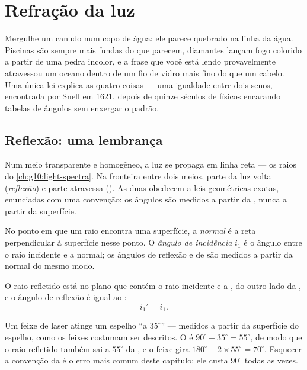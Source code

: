 \chapter{Refração da luz}\label{ch:g10:refraction}

Mergulhe um canudo num copo de água: ele parece quebrado na linha da
água. Piscinas são sempre mais fundas do que parecem, diamantes lançam
fogo colorido a partir de uma pedra incolor, e a frase que você está
lendo provavelmente atravessou um oceano dentro de um fio de vidro mais
fino do que um cabelo. Uma única lei explica as quatro coisas --- uma
igualdade entre dois senos, encontrada por Snell em 1621, depois de
quinze séculos de físicos encarando tabelas de ângulos sem enxergar o
padrão.

\section{Reflexão: uma lembrança}

Num meio transparente e homogêneo, a luz se propaga em linha reta --- os
raios do \cref{ch:g10:light-spectra}. Na fronteira entre dois meios,
parte da luz volta (\emph{reflexão}) e parte atravessa
(\emph{}). As duas obedecem a leis geométricas exatas,
enunciadas com uma convenção: os ângulos são medidos a partir da
\emph{}, nunca a partir da superfície.

\begin{definition}\label{def:g10:refraction:angles}
No ponto em que um raio encontra uma superfície, a
\emph{normal} é a reta perpendicular à superfície nesse
ponto. O \emph{ângulo de incidência} $i_1$ é o
ângulo entre o raio incidente e a normal; os ângulos de reflexão e de
 são medidos a partir da normal do mesmo modo.
\end{definition}

\begin{proposition}\label{prop:g10:refraction:reflection}
O raio refletido está no plano que contém o raio incidente e a , do
outro lado da , e o ângulo de reflexão é igual ao :
\[
i_1' = i_1 .
\]
\end{proposition}
\admitted

\begin{example}\label{ex:g10:refraction:mirror}
Um feixe de laser atinge um espelho ``a $35^\circ$'' --- medidos a partir
da superfície do espelho, como os feixes costumam ser descritos. O  é $90^\circ - 35^\circ = 55^\circ$, de modo que o raio
refletido também sai a $55^\circ$ da , e o feixe gira
$180^\circ - 2 \times 55^\circ = 70^\circ$. Esquecer a convenção da
 é o erro mais comum deste capítulo; ele custa $90^\circ$ todas as
vezes.
\end{example}

